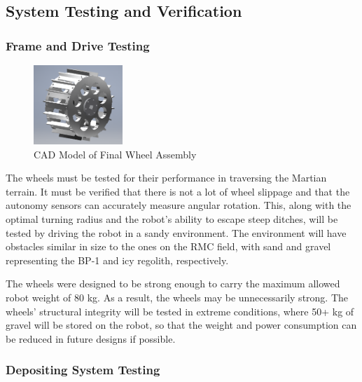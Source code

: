 \documentclass[class=article, crop=false]{standalone}
\begin{document}
	\subsection{System Testing and Verification}
	\label{subsec:system_testing_and_verification}
	
	
	
	\subsubsection{Frame and Drive Testing}
	
	\begin{figure}
		\centering
	 	\includegraphics[width=0.30\textwidth]{09_Figures/final_wheel.png}
	 	\caption{CAD Model of Final Wheel Assembly}
	 	\label{fig:fan-cad}
	\end{figure}	
	
	The wheels must be tested for their performance in traversing the Martian terrain. It must be verified that there is not a lot of wheel slippage and that the autonomy sensors can accurately measure angular rotation. This, along with the optimal turning radius and the robot's ability to escape steep ditches, will be tested by driving the robot in a sandy environment. The environment will have obstacles similar in size to the ones on the RMC field, with sand and gravel representing the BP-1 and icy regolith, respectively.

The wheels were designed to be strong enough to carry the maximum allowed robot weight of 80 kg.  As a result, the wheels may be unnecessarily strong. The wheels' structural integrity will be tested in extreme conditions, where 50+ kg of gravel will be stored on the robot, so that the weight and power consumption can be reduced in future designs if possible.

	\subsubsection{Depositing System Testing}
	
\end{document}
